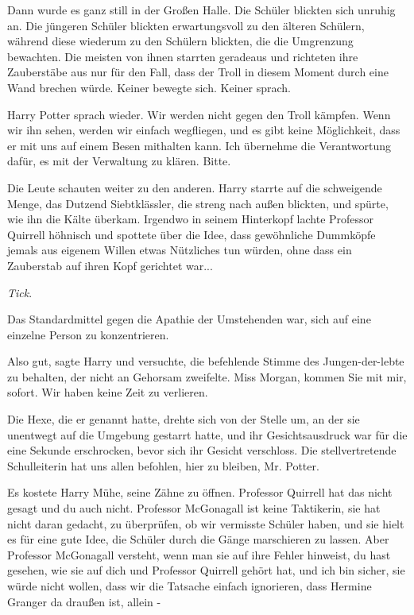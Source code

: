 Dann wurde es ganz still in der Großen Halle. Die Schüler blickten sich unruhig
an. Die jüngeren Schüler blickten erwartungsvoll zu den älteren Schülern,
während diese wiederum zu den Schülern blickten, die die Umgrenzung bewachten.
Die meisten von ihnen starrten geradeaus und richteten ihre Zauberstäbe aus nur
für den Fall, dass der Troll in diesem Moment durch eine Wand brechen würde.
Keiner bewegte sich. Keiner sprach.

Harry Potter sprach wieder. \glqq{}Wir werden nicht gegen den Troll kämpfen. Wenn
wir ihn sehen, werden wir einfach wegfliegen, und es gibt keine Möglichkeit,
dass er mit uns auf einem Besen mithalten kann. Ich übernehme die Verantwortung
dafür, es mit der Verwaltung zu klären. Bitte.\grqq{}

Die Leute schauten weiter zu den anderen. Harry starrte auf die schweigende
Menge, das Dutzend Siebtklässler, die streng nach außen blickten, und spürte,
wie ihn die Kälte überkam. Irgendwo in seinem Hinterkopf lachte Professor
Quirrell höhnisch und spottete über die Idee, dass gewöhnliche Dummköpfe jemals
aus eigenem Willen etwas Nützliches tun würden, ohne dass ein Zauberstab auf
ihren Kopf gerichtet war...

\emph{Tick}.

Das Standardmittel gegen die Apathie der Umstehenden war, sich auf eine einzelne
Person zu konzentrieren.

\glqq{}Also gut\grqq{}, sagte Harry und versuchte, die befehlende Stimme des
Jungen-der-lebte zu behalten, der nicht an Gehorsam zweifelte. \glqq{}Miss
Morgan, kommen Sie mit mir, sofort. Wir haben keine Zeit zu verlieren.\grqq{}

Die Hexe, die er genannt hatte, drehte sich von der Stelle um, an der sie
unentwegt auf die Umgebung gestarrt hatte, und ihr Gesichtsausdruck war für die
eine Sekunde erschrocken, bevor sich ihr Gesicht verschloss. \glqq{}Die
stellvertretende Schulleiterin hat uns allen befohlen, hier zu bleiben, Mr.
Potter.\grqq{}

Es kostete Harry Mühe, seine Zähne zu öffnen. \glqq{}Professor Quirrell hat das
nicht gesagt und du auch nicht. Professor McGonagall ist keine Taktikerin, sie
hat nicht daran gedacht, zu überprüfen, ob wir vermisste Schüler haben, und sie
hielt es für eine gute Idee, die Schüler durch die Gänge marschieren zu lassen.
Aber Professor McGonagall versteht, wenn man sie auf ihre Fehler hinweist, du
hast gesehen, wie sie auf dich und Professor Quirrell gehört hat, und ich bin
sicher, sie würde nicht wollen, dass wir die Tatsache einfach ignorieren, dass
Hermine Granger da draußen ist, allein -\grqq{}

